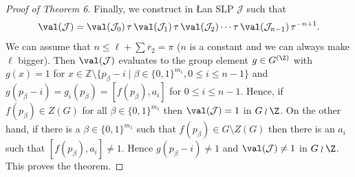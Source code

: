 \begin{proof}[Proof of Theorem 6]
Finally, we construct in \L an SLP $\mathcal{J}$ such that 
\[ 
\val(\mathcal{J}) = \val(\mathcal{J}_0)\, \tau \,\val(\mathcal{J}_1) \,\tau\, \val(\mathcal{J}_2) \cdots \tau \, \val(\mathcal{J}_{n-1}) \,\tau^{-n+1} .
\]
We can assume that $n \leq \ell+\sum \overline{r}_2 = \pi$ ($n$ is a constant and we can always make $\ell$ bigger).
Then $\val(\mathcal{J})$ evaluates to the group element $g \in G^{(\Z)}$ with $g(x) = 1$ for 
$x \in \mathbb{Z} \setminus \{ p_\beta - i \mid \beta \in \{0,1\}^{m_1}, 0 \leq i \leq n-1 \}$ and
$g(p_\beta - i) = g_i(p_\beta) = [f(p_\beta),a_i]$ for $0 \leq i \leq n-1$.
Hence, if $f(p_{\beta}) \in Z(G)$ for all $\beta \in \{0,1\}^{m_1}$ then 
$\val(\mathcal{J})=1$ in $G \wr \Z$. On the other hand, if there is a $\beta \in \{0,1\}^{m_1}$ such that
$f(p_{\beta}) \in G \setminus Z(G)$ then there is an $a_i$ such that 
$[f(p_\beta),a_i] \neq 1$. Hence $g(p_\beta - i) \neq 1$ and 
$\val(\mathcal{J})\neq 1$ in $G \wr \Z$. 
This proves the theorem.
\end{proof}
